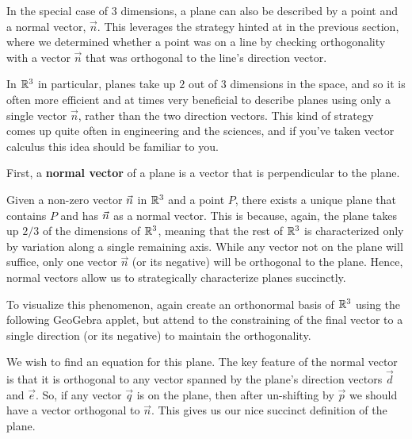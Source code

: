 \documentclass{ximera}
\begin{document}
In the special case of 3 dimensions, a plane can also be described by
a point and a normal vector, $\vec{n}$. This leverages the strategy hinted at in the previous section, where we determined whether a point was on a line by checking orthogonality with a vector $\vec{n}$ that was orthogonal to the line's direction vector.

In $\mathbb{R}^3$ in particular, planes take up $2$ out of $3$ dimensions in the space, and so it is often more efficient and at times very beneficial to describe planes using only a single vector $\vec{n}$, rather than the two direction vectors. This kind of strategy comes up quite often in engineering and the sciences, and if you've taken vector calculus this idea should be familiar to you.

First, a \textbf{normal vector} of a plane is a vector that is
perpendicular to the plane.
\begin{center}
\end{center}

Given a non-zero vector $\vec{n}$ in $\mathbb{R}^3$ and a point $P$, there
exists a unique plane that contains $P$ and has $\vec{n}$ as a normal
vector. This is because, again, the plane takes up $2/3$ of the dimensions of $\mathbb{R}^3$, meaning that the rest of $\mathbb{R}^3$ is characterized only by variation along a single remaining axis. While any vector not on the plane will suffice, only one vector $\vec{n}$ (or its negative) will be orthogonal to the plane. Hence, normal vectors allow us to strategically characterize planes succinctly.

To visualize this phenomenon, again create an orthonormal basis of $\mathbb{R}^3$ using the following GeoGebra applet, but attend to the constraining of the final vector to a single direction (or its negative) to maintain the orthogonality.

\begin{center}
\end{center}


We wish to find an equation for this plane. The key feature of the normal vector is that it is orthogonal to any vector spanned by the plane's direction vectors $\vec{d}$ and $\vec{e}$. So, if any vector $\vec{q}$ is on the plane, then after un-shifting by $\vec{p}$ we should have a vector orthogonal to $\vec{n}$. This gives us our nice succinct definition of the plane.
\end{document}
